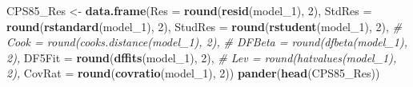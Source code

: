 \documentclass[]{article}
\newenvironment{Shaded}{\begin{snugshade}}{\end{snugshade}}
\newcommand{\KeywordTok}[1]{\textcolor[rgb]{0.13,0.29,0.53}{\textbf{#1}}}
\newcommand{\DataTypeTok}[1]{\textcolor[rgb]{0.13,0.29,0.53}{#1}}
\newcommand{\DecValTok}[1]{\textcolor[rgb]{0.00,0.00,0.81}{#1}}
\newcommand{\StringTok}[1]{\textcolor[rgb]{0.31,0.60,0.02}{#1}}
\newcommand{\CommentTok}[1]{\textcolor[rgb]{0.56,0.35,0.01}{\textit{#1}}}
\newcommand{\NormalTok}[1]{#1}
\begin{document}
\begin{Shaded}
\begin{Highlighting}[]
\NormalTok{  CPS85_Res <-}\StringTok{ }\KeywordTok{data.frame}\NormalTok{(}\DataTypeTok{Res     =} \KeywordTok{round}\NormalTok{(}\KeywordTok{resid}\NormalTok{(model_}\DecValTok{1}\NormalTok{), }\DecValTok{2}\NormalTok{),}
                          \DataTypeTok{StdRes  =} \KeywordTok{round}\NormalTok{(}\KeywordTok{rstandard}\NormalTok{(model_}\DecValTok{1}\NormalTok{), }\DecValTok{2}\NormalTok{),}
                          \DataTypeTok{StudRes =} \KeywordTok{round}\NormalTok{(}\KeywordTok{rstudent}\NormalTok{(model_}\DecValTok{1}\NormalTok{), }\DecValTok{2}\NormalTok{),}
                          \CommentTok{# Cook    = round(cooks.distance(model_1), 2),}
                          \CommentTok{# DFBeta  = round(dfbeta(model_1), 2),}
                          \DataTypeTok{DF5Fit  =} \KeywordTok{round}\NormalTok{(}\KeywordTok{dffits}\NormalTok{(model_}\DecValTok{1}\NormalTok{), }\DecValTok{2}\NormalTok{),}
                          \CommentTok{# Lev     = round(hatvalues(model_1), 2),}
                          \DataTypeTok{CovRat  =} \KeywordTok{round}\NormalTok{(}\KeywordTok{covratio}\NormalTok{(model_}\DecValTok{1}\NormalTok{), }\DecValTok{2}\NormalTok{))}
  \KeywordTok{pander}\NormalTok{(}\KeywordTok{head}\NormalTok{(CPS85_Res))}
\end{Highlighting}
\end{Shaded}
\end{document}
